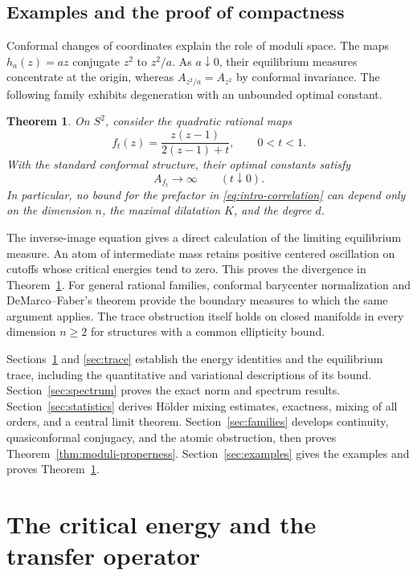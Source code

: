 \documentclass[11pt,reqno]{amsart}
\theoremstyle{plain}
\newtheorem{theorem}{Theorem}[section]
\theoremstyle{definition}
\theoremstyle{remark}
\numberwithin{equation}{section}
\begin{document}
\subsection{Examples and the proof of compactness}

Conformal changes of coordinates explain the role of moduli space. The maps $h_a(z)=az$ conjugate $z^2$ to $z^2/a$. As $a\downarrow0$, their equilibrium measures concentrate at the origin, whereas $A_{z^2/a}=A_{z^2}$ by conformal invariance. The following family exhibits degeneration with an unbounded optimal constant.

\begin{theorem}\label{thm:nonuniform-intro}
On $S^2$, consider the quadratic rational maps
\begin{equation}\label{eq:degenerate-family}
 f_t(z)=\frac{z(z-1)}{2(z-1)+t},\qquad 0<t<1.
\end{equation}
With the standard conformal structure, their optimal constants satisfy
\[
 A_{f_t}\longrightarrow\infty\qquad(t\downarrow0).
\]
In particular, no bound for the prefactor in \eqref{eq:intro-correlation} can depend only on the dimension $n$, the maximal dilatation $K$, and the degree $d$.
\end{theorem}

The inverse-image equation gives a direct calculation of the limiting equilibrium measure. An atom of intermediate mass retains positive centered oscillation on cutoffs whose critical energies tend to zero. This proves the divergence in Theorem~\ref{thm:nonuniform-intro}. For general rational families, conformal barycenter normalization and DeMarco--Faber's theorem provide the boundary measures to which the same argument applies. The trace obstruction itself holds on closed manifolds in every dimension $n\ge2$ for structures with a common ellipticity bound.

Sections~\ref{sec:energy} and \ref{sec:trace} establish the energy identities and the equilibrium trace, including the quantitative and variational descriptions of its bound. Section~\ref{sec:spectrum} proves the exact norm and spectrum results. Section~\ref{sec:statistics} derives H\"older mixing estimates, exactness, mixing of all orders, and a central limit theorem. Section~\ref{sec:families} develops continuity, quasiconformal conjugacy, and the atomic obstruction, then proves Theorem~\ref{thm:moduli-properness}. Section~\ref{sec:examples} gives the examples and proves Theorem~\ref{thm:nonuniform-intro}.

\section{The critical energy and the transfer operator}\label{sec:energy}
\end{document}
